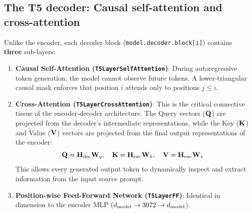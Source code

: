 \documentclass[../labs.tex]{subfiles}
\begin{document}
\subsection{The T5 decoder: Causal self-attention and cross-attention}

Unlike the encoder, each decoder block (\texttt{model.decoder.block[i]}) contains \textbf{three} sub-layers:
\begin{enumerate}
    \item \textbf{Causal Self-Attention (\texttt{T5LayerSelfAttention})}: During autoregressive token generation, the model cannot observe future tokens. A lower-triangular causal mask enforces that position $i$ attends only to positions $j \le i$.
    \item \textbf{Cross-Attention (\texttt{T5LayerCrossAttention})}: This is the critical connective tissue of the encoder-decoder architecture. The Query vectors ($\mathbf{Q}$) are projected from the decoder's intermediate representations, while the Key ($\mathbf{K}$) and Value ($\mathbf{V}$) vectors are projected from the final output representations of the encoder:
    \begin{equation}
        \mathbf{Q} = \mathbf{H}_{\text{dec}} \mathbf{W}_q, \quad \mathbf{K} = \mathbf{H}_{\text{enc}} \mathbf{W}_k, \quad \mathbf{V} = \mathbf{H}_{\text{enc}} \mathbf{W}_v
    \end{equation}
    This allows every generated output token to dynamically inspect and extract information from the input source prompt.
    \item \textbf{Position-wise Feed-Forward Network (\texttt{T5LayerFF})}: Identical in dimension to the encoder MLP ($d_{\text{model}} \to 3072 \to d_{\text{model}}$).
\end{enumerate}
\end{document}
